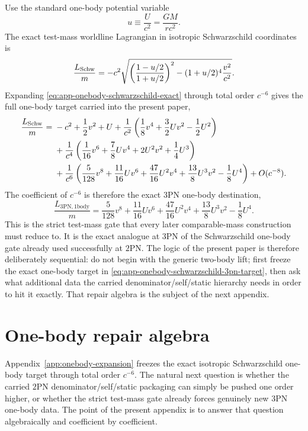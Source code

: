 \documentclass[11pt]{article}
\begin{document}
Use the standard one-body potential variable
\begin{equation}
 u\equiv \frac{U}{c^2}=\frac{GM}{rc^2}.
\label{eq:app-onebody-u-def}
\end{equation}
The exact test-mass worldline Lagrangian in isotropic Schwarzschild coordinates
is
\begin{equation}
\frac{L_{\rm Schw}}{m}
=-c^2\sqrt{\left(\frac{1-u/2}{1+u/2}\right)^2-(1+u/2)^4\frac{v^2}{c^2}}.
\label{eq:app-onebody-schwarzschild-exact}
\end{equation}
Expanding \eqref{eq:app-onebody-schwarzschild-exact} through total order
$c^{-6}$ gives the full one-body target carried into the present paper,
\begin{align}
\frac{L_{\rm Schw}}{m}
={}&-c^2+\frac12v^2+U
+\frac{1}{c^2}\left(\frac18v^4+\frac32Uv^2-\frac12U^2\right)
\nonumber\\
&
+\frac{1}{c^4}\left(\frac1{16}v^6+\frac78Uv^4+2U^2v^2+\frac14U^3\right)
\nonumber\\
&
+\frac{1}{c^6}\left(
\frac5{128}v^8
+\frac{11}{16}Uv^6
+\frac{47}{16}U^2v^4
+\frac{13}{8}U^3v^2
-\frac18U^4
\right)
+O(c^{-8}).
\label{eq:app-onebody-schwarzschild-3pn}
\end{align}
The coefficient of $c^{-6}$ is therefore the exact $3$PN one-body destination,
\begin{equation}
\boxed{
\frac{L_{3\mathrm{PN},1\mathrm{body}}}{m}
=
\frac5{128}v^8
+\frac{11}{16}Uv^6
+\frac{47}{16}U^2v^4
+\frac{13}{8}U^3v^2
-\frac18U^4.
}
\label{eq:app-onebody-schwarzschild-3pn-target}
\end{equation}
This is the strict test-mass gate that every later comparable-mass construction
must reduce to. It is the exact analogue at $3$PN of the Schwarzschild one-body
gate already used successfully at $2$PN. The logic of the present paper is
therefore deliberately sequential: do not begin with the generic two-body lift;
first freeze the exact one-body target in
\eqref{eq:app-onebody-schwarzschild-3pn-target}, then ask what additional data
the carried denominator/self/static hierarchy needs in order to hit it exactly.
That repair algebra is the subject of the next appendix.


\section{One-body repair algebra}
\label{app:onebody-repair}

Appendix~\ref{app:onebody-expansion} freezes the exact isotropic Schwarzschild
one-body target through total order $c^{-6}$.  The natural next question is
whether the carried $2$PN denominator/self/static packaging can simply be pushed
one order higher, or whether the strict test-mass gate already forces genuinely
new $3$PN one-body data.  The point of the present appendix is to answer that
question algebraically and coefficient by coefficient.
\end{document}
